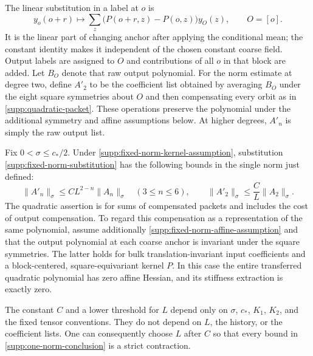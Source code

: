 The linear substitution in a label at $o$ is
\begin{equation}
 y_o(o+r)\longmapsto\sum_z
       \bigl(P(o+r,z)-P(o,z)\bigr)y_O(z),\qquad O=[o].
 \label{supp:fixed-norm-substitution}
\end{equation}
It is the linear part of changing anchor after applying the conditional
mean; the constant identity makes it independent of the chosen constant
coarse field.  Output labels are assigned to $O$ and contributions of all
$o$ in that block are added.  Let $B_O$ denote that raw output polynomial.
For the norm estimate at degree two, define $A'_2$ to be the coefficient
list obtained by averaging $B_O$ under the eight square symmetries about
$O$ and then compensating every orbit as in
\eqref{supp:quadratic-packet}.  These operations preserve the polynomial
under the additional symmetry and affine assumptions below.  At higher
degrees, $A'_n$ is simply the raw output list.

\begin{lemma}
\label{supp:one-norm-contraction}
Fix $0<\sigma\le c_*/2$.  Under
\eqref{supp:fixed-norm-kernel-assumption}, substitution
\eqref{supp:fixed-norm-substitution} has the following bounds in the
single norm just defined:
\begin{equation}
 \|A'_n\|_\sigma\le C L^{2-n}\|A_n\|_\sigma
       \quad(3\le n\le6),\qquad
 \|A'_2\|_\sigma\le \frac C L\|A_2\|_\sigma.
 \label{supp:one-norm-conclusion}
\end{equation}
The quadratic assertion is for sums of compensated packets and includes
the cost of output compensation.  To regard this compensation as a
representation of the same polynomial, assume additionally
\eqref{supp:fixed-norm-affine-assumption} and that the output polynomial
at each coarse anchor is invariant under the square symmetries.  The
latter holds for bulk translation-invariant input coefficients and a
block-centered, square-equivariant kernel $P$.  In this case the entire
transferred quadratic polynomial has zero affine Hessian, and its
stiffness extraction is exactly zero.

The constant $C$ and a lower threshold for $L$ depend only on $\sigma$,
$c_*$, $K_1$, $K_2$, and the fixed tensor conventions.  They do not depend
on $L$, the history, or the coefficient lists.  One can consequently
choose $L$ after $C$ so that every bound in
\eqref{supp:one-norm-conclusion} is a strict contraction.
\end{lemma}

